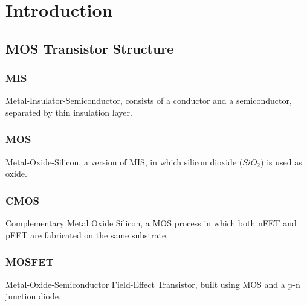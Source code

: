 

\newpage
\clearpage
{}
\tableofcontents



\clearpage
{}

\newcommand{\sectionbreak}{\clearpage}

\section{Introduction}


\subsection{MOS Transistor Structure}


    \subsubsection{MIS}  Metal-Insulator-Semiconductor, consists of a conductor and a semiconductor, separated by thin insulation layer.
    \subsubsection{MOS}  Metal-Oxide-Silicon, a version of MIS, in which silicon dioxide ($SiO_2$) is used as oxide.
    \subsubsection{CMOS}  Complementary Metal Oxide Silicon, a MOS process in which both nFET and pFET are fabricated on the same substrate.
    \subsubsection{MOSFET} Metal-Oxide-Semiconductor Field-Effect Transistor, built using MOS and a p-n junction diode.
    


